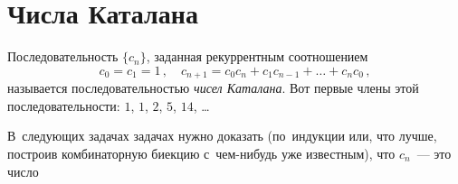 
\section*{Числа Каталана}


Последовательность $\{ c_{n} \}$, заданная рекуррентным соотношением
\[
    c_{0} = c_{1} = 1
\, , \quad
    c_{n+1} = c_{0} c_{n} + c_{1} c_{n-1} + \ldots + c_{n} c_{0}
\, , \]
называется последовательностью \emph{чисел Каталана}.
Вот первые члены этой последовательности: $1$, $1$, $2$, $5$, $14$, \ldots

В~следующих задачах задачах нужно доказать (по~индукции или, что лучше,
построив комбинаторную биекцию с~чем-нибудь уже известным), что $c_n$~---
это число

